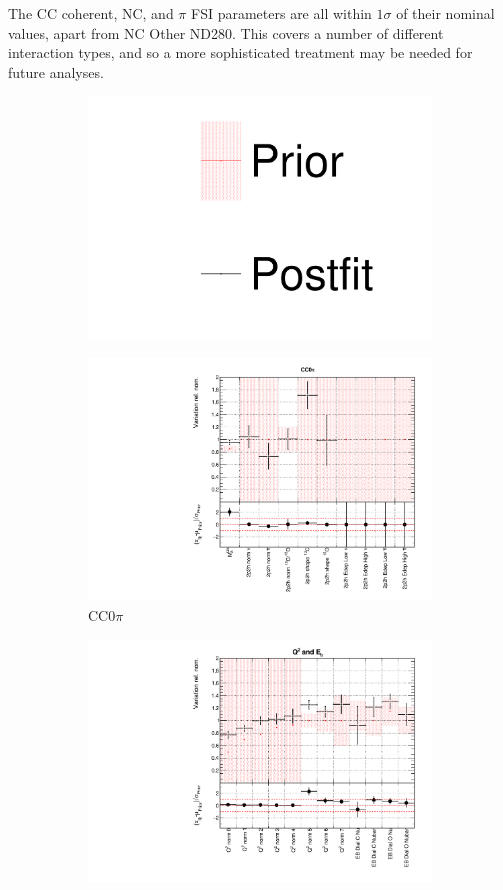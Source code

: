 The CC coherent, NC, and $\pi$ FSI parameters are all within $1\sigma$ of their nominal values, apart from NC Other ND280. This covers a number of different interaction types, and so a more sophisticated treatment may be needed for future analyses. 

\begin{figure}[!htbp]
\centering
\begin{subfigure}{0.95\textwidth}
  \centering
  \includegraphics[width=0.25\linewidth]{figs/dat_leg}
\end{subfigure}
\begin{subfigure}{0.49\textwidth}
  \centering
  \includegraphics[width=0.9\linewidth]{figs/datxsec1}
  \caption{CC0$\pi$}
\end{subfigure}
\begin{subfigure}{0.49\textwidth}
  \centering
  \includegraphics[width=0.9\linewidth]{figs/datxsec2}

\end{subfigure}
\end{figure}
